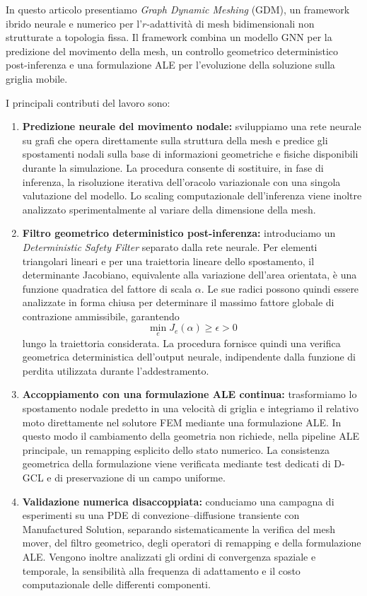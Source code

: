 In questo articolo presentiamo \textit{Graph Dynamic Meshing} (GDM), un framework ibrido neurale e numerico per l'$r$-adattività di mesh bidimensionali non strutturate a topologia fissa. Il framework combina un modello GNN per la predizione del movimento della mesh, un controllo geometrico deterministico post-inferenza e una formulazione ALE per l'evoluzione della soluzione sulla griglia mobile.

I principali contributi del lavoro sono:

\begin{enumerate}

    \item \textbf{Predizione neurale del movimento nodale:}
    sviluppiamo una rete neurale su grafi che opera direttamente sulla struttura della mesh e predice gli spostamenti nodali sulla base di informazioni geometriche e fisiche disponibili durante la simulazione. La procedura consente di sostituire, in fase di inferenza, la risoluzione iterativa dell'oracolo variazionale con una singola valutazione del modello. Lo scaling computazionale dell'inferenza viene inoltre analizzato sperimentalmente al variare della dimensione della mesh.

    \item \textbf{Filtro geometrico deterministico post-inferenza:}
    introduciamo un \textit{Deterministic Safety Filter} separato dalla rete neurale. Per elementi triangolari lineari e per una traiettoria lineare dello spostamento, il determinante Jacobiano, equivalente alla variazione dell'area orientata, è una funzione quadratica del fattore di scala $\alpha$. Le sue radici possono quindi essere analizzate in forma chiusa per determinare il massimo fattore globale di contrazione ammissibile, garantendo
    \[
    \min_{e} J_e(\alpha) \geq \epsilon>0
    \]
    lungo la traiettoria considerata. La procedura fornisce quindi una verifica geometrica deterministica dell'output neurale, indipendente dalla funzione di perdita utilizzata durante l'addestramento.

    \item \textbf{Accoppiamento con una formulazione ALE continua:}
    trasformiamo lo spostamento nodale predetto in una velocità di griglia e integriamo il relativo moto direttamente nel solutore FEM mediante una formulazione ALE. In questo modo il cambiamento della geometria non richiede, nella pipeline ALE principale, un remapping esplicito dello stato numerico. La consistenza geometrica della formulazione viene verificata mediante test dedicati di D-GCL e di preservazione di un campo uniforme.

    \item \textbf{Validazione numerica disaccoppiata:}
    conduciamo una campagna di esperimenti su una PDE di convezione--diffusione transiente con Manufactured Solution, separando sistematicamente la verifica del mesh mover, del filtro geometrico, degli operatori di remapping e della formulazione ALE. Vengono inoltre analizzati gli ordini di convergenza spaziale e temporale, la sensibilità alla frequenza di adattamento e il costo computazionale delle differenti componenti.

\end{enumerate}

